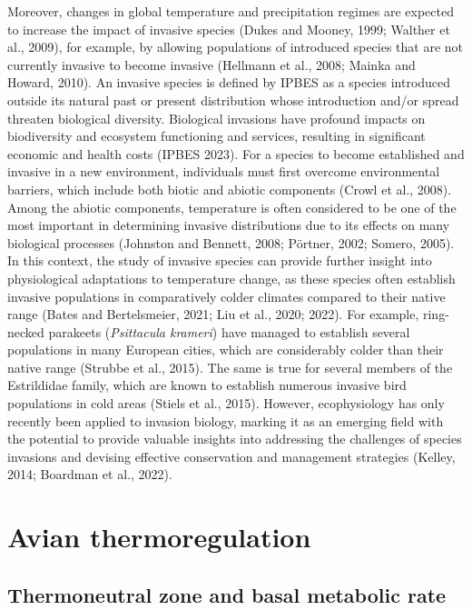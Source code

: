 \documentclass[10pt, twoside]{book} %
\begin{document}
Moreover, changes in global temperature and precipitation regimes are expected to increase the impact of invasive species (Dukes and Mooney, 1999; Walther et al., 2009), for example, by allowing populations of introduced species that are not currently invasive to become invasive (Hellmann et al., 2008; Mainka and Howard, 2010). An invasive species is defined by IPBES as a species introduced outside its natural past or present distribution whose introduction and/or spread threaten biological diversity. Biological invasions have profound impacts on biodiversity and ecosystem functioning and services, resulting in significant economic and health costs (IPBES 2023). For a species to become established and invasive in a new environment, individuals must first overcome environmental barriers, which include both biotic and abiotic components (Crowl et al., 2008). Among the abiotic components, temperature is often considered to be one of the most important in determining invasive distributions due to its effects on many biological processes (Johnston and Bennett, 2008; Pörtner, 2002; Somero, 2005). In this context, the study of invasive species can provide further insight into physiological adaptations to temperature change, as these species often establish invasive populations in comparatively colder climates compared to their native range (Bates and Bertelsmeier, 2021; Liu et al., 2020; 2022). For example, ring-necked parakeets (\textit{Psittacula krameri}) have managed to establish several populations in many European cities, which are considerably colder than their native range (Strubbe et al., 2015). The same is true for several members of the Estrildidae family, which are known to establish numerous invasive bird populations in cold areas (Stiels et al., 2015). However, ecophysiology has only recently been applied to invasion biology, marking it as an emerging field with the potential to provide valuable insights into addressing the challenges of species invasions and devising effective conservation and management strategies (Kelley, 2014; Boardman et al., 2022).\\

\section{Avian thermoregulation}
\subsection{Thermoneutral zone and basal metabolic rate}
\end{document}
